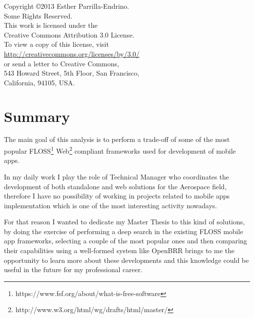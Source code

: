 \documentclass[a4paper,12pt]{book}
\begin{document}
\newpage
\thispagestyle{empty}
\vspace{5cm}
\begin{flushright}
\begin{large}
Copyright \copyright 2013 Esther Parrilla-Endrino.\\
Some Rights Reserved.\\
This work is licensed under the\\
Creative Commons Attribution 3.0 License.\\
To view a copy of this license, visit\\
\url{http://creativecommons.org/licenses/by/3.0/}\\
or send a letter to Creative Commons,\\
543 Howard Street, 5th Floor, San Francisco,\\
California, 94105, USA.\\
\end{large}
\end{flushright}

\newpage

\tableofcontents  %

\renewcommand{\refname}{Bibliography}
\addtolength{\parskip}{\baselineskip}


\chapter*{Summary}
\label{chap:summary}

The main goal of this analysis is to perform a trade-off of some of the most popular FLOSS\footnote{https://www.fsf.org/about/what-is-free-software} Web\footnote{http://www.w3.org/html/wg/drafts/html/master/} compliant frameworks used for development of mobile apps.

In my daily work I play the role of Technical Manager who coordinates the development of both standalone and web solutions for the Aerospace field, therefore I have no possibility of working in projects related to mobile apps implementation which is one of the most interesting activity nowadays.

For that reason I wanted to dedicate my Master Thesis to this kind of solutions, by doing the exercise of performing a deep search in the existing FLOSS mobile app frameworks, selecting a couple of the most popular ones and then comparing their capabilities using a well-formed system like OpenBRR brings to me the opportunity to learn more about these developments and this knowledge could be useful in the future for my professional career.
\end{document}
